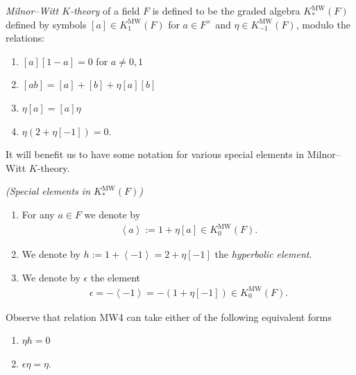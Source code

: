 \documentclass[11pt,openany]{book}
\providecommand{\MW}{\mathrm{MW}}
\begin{document}
\begin{definition}\label{def:MW} 
\textit{Milnor--Witt $K$-theory} of a field $F$ is defined to be the graded algebra $K_\ast^\MW(F)$ defined by symbols $[a]\in K_1^{\MW}(F)$ for $a\in F^\times$ and $\eta \in K_{-1}^\MW(F)$, modulo the relations:
\begin{enumerate}
    \item[\textbf{(MW1)}] $[a][1-a] = 0$ for $a\ne 0,1$
    \item[\textbf{(MW2)}] $[ab] = [a]+[b] + \eta[a][b]$
    \item[\textbf{(MW3)}] $\eta[a]=[a]\eta$
    \item[\textbf{(MW4)}] $\eta(2+\eta[-1]) = 0$.
\end{enumerate}
\end{definition}

It will benefit us to have some notation for various special elements in Milnor--Witt $K$-theory.

\begin{notation}\label{nota:special-elts-KMW} \textit{(Special elements in $K_\ast^\MW(F)$)}
\begin{enumerate}
    \item For any $a \in F$ we denote by
\begin{align*}
    \left\langle a \right\rangle := 1 + \eta[a] \in K_0^\MW(F).
\end{align*}
    \item We denote by $h := 1 + \left\langle -1 \right\rangle = 2 + \eta[-1]$ the \textit{hyperbolic element}.
    \item We denote by $\epsilon$ the element
    \begin{align*}
        \epsilon = - \left\langle -1 \right\rangle = -(1 + \eta[-1]) \in K_0^\MW(F).
    \end{align*}
\end{enumerate}
\end{notation}

\begin{remark} Observe that relation MW4 can take either of the following equivalent forms
\begin{enumerate}
    \item[\textbf{(MW4)}] $\eta h = 0$
    \item[\textbf{(MW4)}] $\epsilon \eta = \eta$.
\end{enumerate}
\end{remark}
\end{document}
